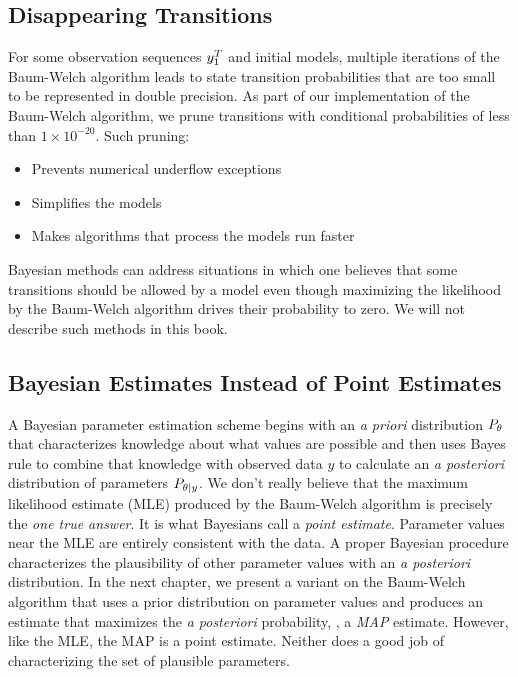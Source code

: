 \subsection{Disappearing Transitions}
\label{sec:disappear}

For some observation sequences $y_{1}^{T}$ and initial models,
multiple iterations of the Baum-Welch algorithm leads to state
transition probabilities that are too small to be represented in
double precision.  As part of our implementation of the Baum-Welch
algorithm, we prune transitions with conditional probabilities of less
than $1\times 10^{-20}$.  Such pruning:
\begin{itemize}
\item Prevents numerical underflow exceptions
\item Simplifies the models
\item Makes algorithms that process the models run faster
\end{itemize}
Bayesian methods can address situations in which one believes that
some transitions should be allowed by a model even though maximizing
the likelihood by the Baum-Welch algorithm drives their probability to
zero.  We will not describe such methods in this book.

\subsection{Bayesian Estimates Instead of Point Estimates}
\label{sec:EstWholeDist}

A Bayesian parameter estimation scheme begins with an \emph{a priori}
distribution $P_{\theta}$ that characterizes knowledge about what
values are possible and then uses Bayes rule to combine that knowledge
with observed data $y$ to calculate an \emph{a posteriori}
distribution of parameters $P_{\theta|y}$.  We don't really
believe that the maximum likelihood estimate (MLE) produced by the
Baum-Welch algorithm is precisely the \emph{one true answer}.  It is
what Bayesians call a \emph{point estimate}.  Parameter values near
the MLE are entirely consistent with the data.  A proper Bayesian
procedure characterizes the plausibility of other parameter values
with an \emph{a posteriori} distribution.  In the next chapter, we
present a variant on the Baum-Welch algorithm that uses a prior
distribution on parameter values and produces an estimate that
maximizes the \emph{a posteriori} probability, \ie, a \emph{MAP}
estimate.  However, like the MLE, the MAP is a point estimate.
Neither does a good job of characterizing the set of plausible
parameters.

